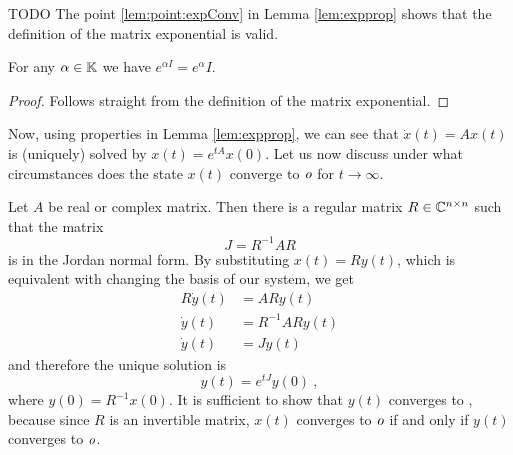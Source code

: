 \begin{remark}
	TODO
	The point \ref{lem:point:expConv} in Lemma \ref{lem:expprop} shows that the definition of the matrix exponential is valid.
\end{remark}

\begin{lemma}
	\label{lem:matrixExpIdentity}
	For any $\alpha\in\mathbb{K}$ we have $e^{\alpha I}=e^{\alpha}I$.
\end{lemma}

\begin{proof}
	Follows straight from the definition of the matrix exponential.
\end{proof}

Now, using properties in Lemma \ref{lem:expprop}, we can see that $\dot{x}(t)=Ax(t)$ is (uniquely) solved by $x(t)=e^{tA}x(0)$. Let us now discuss under what circumstances does the state $x(t)$ converge to $\textit{o}$ for $t\rightarrow\infty$. 

Let $A$ be real or complex matrix. Then there is a regular matrix $R\in \mathbb{C}^{n\times n}$ such that the matrix $$J=R^{-1}AR$$ is in the Jordan normal form. By substituting $x(t)=Ry(t)$, which is equivalent with changing the basis of our system, we get 
\begin{align*}
	R\dot{y}(t)&=ARy(t) \\
	\dot{y}(t)&=R^{-1}ARy(t) \\
	\dot{y}(t)&=Jy(t)
\end{align*}
and therefore the unique solution is $$y(t)=e^{tJ}y(0)\ ,$$ where $y(0)=R^{-1}x(0)$. It is sufficient to show that $y(t)$ converges to \nullvector, because since $R$ is an invertible matrix,  $x(t)$ converges to $\textit{o}$ if and only if $y(t)$ converges to $\textit{o}$.

